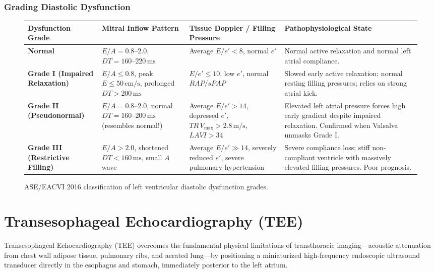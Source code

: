 \documentclass[11pt,a4paper]{article}
\begin{document}
\subsubsection{Grading Diastolic Dysfunction}
\begin{figure}[htbp]
\centering
\setlength{\tabcolsep}{4pt}
\begin{tabular}{p{3.2cm}p{3.5cm}p{3.5cm}p{4.2cm}}
\toprule
\textbf{Dysfunction Grade} & \textbf{Mitral Inflow Pattern} & \textbf{Tissue Doppler / Filling Pressure} & \textbf{Pathophysiological State} \\
\midrule
\textbf{Normal} & $E/A = 0.8\text{--}2.0$, $DT = 160\text{--}220\,\text{ms}$ & Average $E/e' < 8$, normal $e'$ & Normal active relaxation and normal left atrial compliance. \\
\addlinespace
\textbf{Grade I (Impaired Relaxation)} & $E/A \le 0.8$, peak $E \le 50\,\text{cm/s}$, prolonged $DT > 200\,\text{ms}$ & $E/e' \le 10$, low $e'$, normal $RAP/sPAP$ & Slowed early active relaxation; normal resting filling pressures; relies on strong atrial kick. \\
\addlinespace
\textbf{Grade II (Pseudonormal)} & $E/A = 0.8\text{--}2.0$, normal $DT = 160\text{--}200\,\text{ms}$ (resembles normal!) & Average $E/e' > 14$, depressed $e'$, $TR\,V_{\text{max}} > 2.8\,\text{m/s}$, $LAVI > 34$ & Elevated left atrial pressure forces high early gradient despite impaired relaxation. Confirmed when Valsalva unmasks Grade I. \\
\addlinespace
\textbf{Grade III (Restrictive Filling)} & $E/A > 2.0$, shortened $DT < 160\,\text{ms}$, small $A$ wave & Average $E/e' \gg 14$, severely reduced $e'$, severe pulmonary hypertension & Severe compliance loss; stiff non-compliant ventricle with massively elevated filling pressures. Poor prognosis. \\
\bottomrule
\end{tabular}
\caption{ASE/EACVI 2016 classification of left ventricular diastolic dysfunction grades.}
\label{tab:diastolic_grades}
\end{figure}

\newpage
\section{Transesophageal Echocardiography (TEE)}

Transesophageal Echocardiography (TEE) overcomes the fundamental physical limitations of transthoracic imaging—acoustic attenuation from chest wall adipose tissue, pulmonary ribs, and aerated lung—by positioning a miniaturized high-frequency endoscopic ultrasound transducer directly in the esophagus and stomach, immediately posterior to the left atrium.
\end{document}
